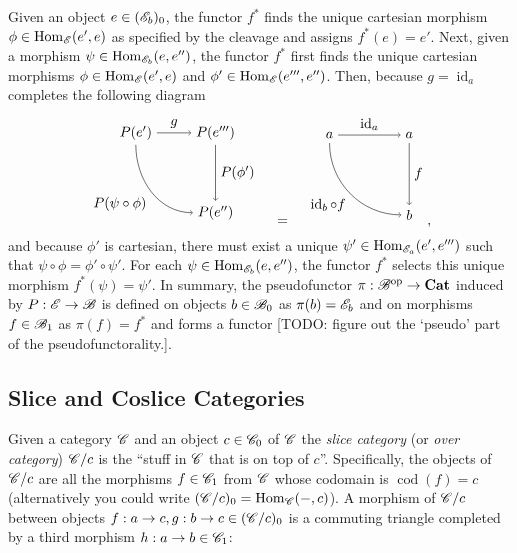 \documentclass[12pt]{article}
\theoremstyle{definition}
\theoremstyle{remark}
\DeclareMathOperator{\id}{id}
\newcommand{\opcat}{\mathrm{op}}
\DeclareMathOperator{\Hom}{Hom}
\DeclareMathOperator{\cod}{cod}
\begin{document}
Given an object $e \in (\mathscr{E}_b)_0$, the functor $f^{\ast}$ finds the unique cartesian morphism $\phi \in \Hom_{\catE}(e',e)$ as specified by the cleavage and assigns $f^{\ast}(e) = e'$. Next, given a morphism $\psi \in \Hom_{\catE_{b}}(e, e'')$, the functor $f^{\ast}$ first finds the unique cartesian morphisms $\phi \in \Hom_{\catE}(e', e)$ and $\phi' \in \Hom_{\catE}(e''', e'')$. Then, because $g = \id_a$ completes the following diagram
\[
    \begin{tikzpicture}
        \draw (-1,+1) node(tl){$P(e')$};
        \draw (+1,+1) node(tr){$P(e''')$};
        \draw (+1,-1) node(br){$P(e'')$};

        \draw[->] (tl) to node[above]{$g$} (tr);
        \draw[->] (tl) to[out=-90, in=180] node[below left]{$P(\psi\circ\phi)$} (br);
        \draw[->] (tr) to node[right]{$P(\phi')$} (br);
    \end{tikzpicture}
    \quad=\quad
    \begin{tikzpicture}
        \draw (-1,+1) node(tl){$a$};
        \draw (+1,+1) node(tr){$a$};
        \draw (+1,-1) node(br){$b$};

        \draw[->] (tl) to node[above]{$\id_{a}$} (tr);
        \draw[->] (tl) to[out=-90, in=180] node[below left]{$\id_{b} \circ f$} (br);
        \draw[->] (tr) to node[right]{$f$} (br);
    \end{tikzpicture},
\]
and because $\phi'$ is cartesian, there must exist a unique $\psi' \in \Hom_{\catE_a}(e', e''')$ such that $\psi \circ \phi = \phi' \circ \psi'$. For each $\psi \in \Hom_{\catE_b}(e, e'')$, the functor $f^{\ast}$ selects this unique morphism $f^{\ast}(\psi) = \psi'$. In summary, the pseudofunctor $\pi : \catB^{\opcat} \to \mathbf{Cat}$ induced by $P : \mathscr{E} \to \mathscr{B}$ is defined on objects $b \in \mathscr{B}_{0}$ as $\pi(b) = \mathscr{E}_{b}$ and on morphisms $f \in \mathscr{B}_{1}$ as $\pi(f) = f^{\ast}$ and forms a functor \textcolor{red!50!black}{[TODO: figure out the `pseudo' part of the pseudofunctorality.]}.

\subsection{Slice and Coslice Categories}

Given a category $\mathscr{C}$ and an object $c \in \mathscr{C}_0$ of $\mathscr{C}$ the \textit{slice category} (or \textit{over category}) $\mathscr{C}/c$ is the ``stuff in $\mathscr{C}$ that is on top of $c$''. Specifically, the objects of $\mathscr{C}/c$ are all the morphisms $f \in \mathscr{C}_1$ from $\mathscr{C}$ whose codomain is $\cod(f) = c$ (alternatively you could write $(\catC/c)_0 = \Hom_{\catC}(-,c)$). A morphism of $\mathscr{C}/c$ between objects $f : a \to c, g : b \to c \in (\mathscr{C}/c)_0$ is a commuting triangle completed by a third morphism $h : a \to b \in \mathscr{C}_1$:
\end{document}
